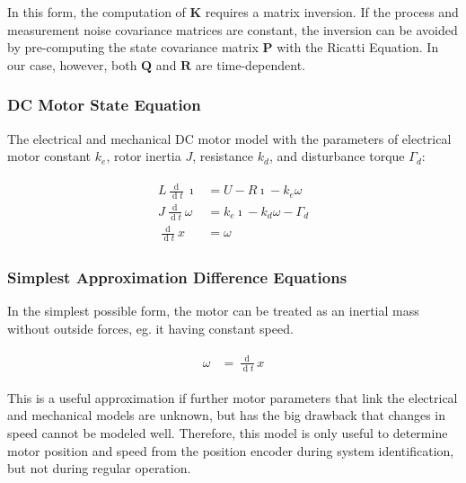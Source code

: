 \documentclass[12pt,a4paper,oneside,openany]{article}
\DeclareMathOperator{\ud}{d}
\newcommand{\mK}{\ensuremath{\mathbf{K}}}
\newcommand{\mP}{\ensuremath{\mathbf{P}}}
\newcommand{\mQ}{\ensuremath{\mathbf{Q}}}
\newcommand{\mR}{\ensuremath{\mathbf{R}}}
\begin{document}
In this form, the computation of $\mK$ requires a matrix inversion. If the process and measurement noise covariance matrices are constant, the inversion can be avoided by pre-computing the state covariance matrix $\mP$ with the Ricatti Equation. In our case, however, both $\mQ$ and $\mR$ are time-dependent.

\subsubsection{DC Motor State Equation}

The electrical and mechanical DC motor model with the parameters of  electrical motor constant $k_e$, rotor inertia $J$, resistance $k_d$, and disturbance torque $\Gamma_d$:

\begin{gather}
\begin{aligned}
L\frac{\ud }{\ud t} \imath&= U - R \imath - k_e \omega \\
J \frac{\ud }{\ud t} \omega &= k_e \imath - k_d \omega - \Gamma_d \\
\frac{\ud}{\ud t} x &= \omega
\end{aligned}
\end{gather}

\subsubsection{Simplest Approximation Difference Equations}

In the simplest possible form, the motor can be treated as an inertial mass without outside forces, eg.{} it having constant speed.

\begin{gather}
\begin{aligned}
\omega &= \frac{\ud}{\ud t} x
\end{aligned}
\end{gather}

This is a useful approximation if further motor parameters that link the electrical and mechanical models are unknown, but has the big drawback that changes in speed cannot be modeled well. Therefore, this model is only useful to determine motor position and speed from the position encoder during system identification, but not during regular operation.
\end{document}
